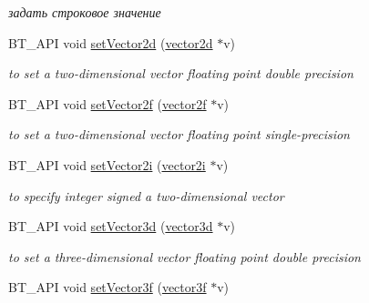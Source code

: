 \begin{DoxyCompactItemize}
\begin{DoxyCompactList}\small\item\em задать строковое значение \end{DoxyCompactList}\item 
\hypertarget{classbt_1_1_variant_af67e59aa5bc4d4761595427bb5946814}{B\-T\-\_\-\-A\-P\-I void \hyperlink{classbt_1_1_variant_af67e59aa5bc4d4761595427bb5946814}{set\-Vector2d} (\hyperlink{classbt_1_1vector2d}{vector2d} $\ast$v)}\label{classbt_1_1_variant_af67e59aa5bc4d4761595427bb5946814}

\begin{DoxyCompactList}\small\item\em to set a two-\/dimensional vector floating point double precision \end{DoxyCompactList}\item 
\hypertarget{classbt_1_1_variant_a4e58dd60979c8410ed68365232062de1}{B\-T\-\_\-\-A\-P\-I void \hyperlink{classbt_1_1_variant_a4e58dd60979c8410ed68365232062de1}{set\-Vector2f} (\hyperlink{classbt_1_1vector2f}{vector2f} $\ast$v)}\label{classbt_1_1_variant_a4e58dd60979c8410ed68365232062de1}

\begin{DoxyCompactList}\small\item\em to set a two-\/dimensional vector floating point single-\/precision \end{DoxyCompactList}\item 
\hypertarget{classbt_1_1_variant_a0e5b9ba8df00c512148df42a66fdc0fa}{B\-T\-\_\-\-A\-P\-I void \hyperlink{classbt_1_1_variant_a0e5b9ba8df00c512148df42a66fdc0fa}{set\-Vector2i} (\hyperlink{classbt_1_1vector2i}{vector2i} $\ast$v)}\label{classbt_1_1_variant_a0e5b9ba8df00c512148df42a66fdc0fa}

\begin{DoxyCompactList}\small\item\em to specify integer signed a two-\/dimensional vector \end{DoxyCompactList}\item 
\hypertarget{classbt_1_1_variant_a1b30e10e7a3950946173ae8833c97703}{B\-T\-\_\-\-A\-P\-I void \hyperlink{classbt_1_1_variant_a1b30e10e7a3950946173ae8833c97703}{set\-Vector3d} (\hyperlink{classbt_1_1vector3d}{vector3d} $\ast$v)}\label{classbt_1_1_variant_a1b30e10e7a3950946173ae8833c97703}

\begin{DoxyCompactList}\small\item\em to set a three-\/dimensional vector floating point double precision \end{DoxyCompactList}\item 
\hypertarget{classbt_1_1_variant_aaeae19063fb2f735c72f83fbc7ba278f}{B\-T\-\_\-\-A\-P\-I void \hyperlink{classbt_1_1_variant_aaeae19063fb2f735c72f83fbc7ba278f}{set\-Vector3f} (\hyperlink{classbt_1_1vector3f}{vector3f} $\ast$v)}\label{classbt_1_1_variant_aaeae19063fb2f735c72f83fbc7ba278f}


\end{DoxyCompactItemize}
